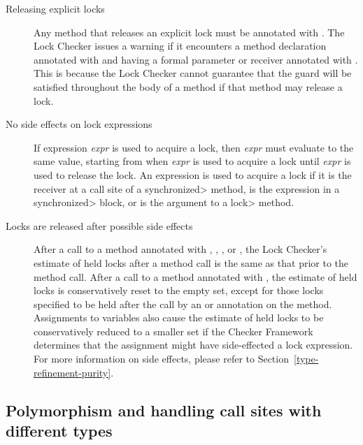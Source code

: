 \begin{description}

\item[Releasing explicit locks]
  Any method that releases an explicit lock must be annotated
  with .
  The Lock Checker issues a warning if it encounters a method declaration
  annotated with  and having a formal parameter
  or receiver annotated with .  This is because
  the Lock Checker cannot guarantee that the guard will be satisfied
  throughout the body of a method if that method may release a lock.

\item[No side effects on lock expressions]
  If expression \emph{expr} is used to acquire a lock, then
  \emph{expr} must evaluate to the same value, starting from when
  \emph{expr} is used to acquire a lock until \emph{expr} is used to
  release the lock.
  An expression is used to acquire a lock if it is the receiver at a
  call site of a \<synchronized> method, is the expression in a
  \<synchronized> block, or is the argument to a \<lock> method.

\item[Locks are released after possible side effects]
  After a call to a method annotated with ,
  , , or ,
  the Lock Checker's estimate of held locks
  after a method call is the same as that prior to the method call.
  After a call to a method annotated with ,
  the estimate of held locks is conservatively reset to the empty set,
  except for those locks specified to be held after the call
  by an  or 
  annotation on the method.  Assignments to variables also
  cause the estimate of held locks to be conservatively reduced
  to a smaller set if the Checker Framework determines that the
  assignment might have side-effected a lock expression.
  For more information on side effects, please refer to
  Section~\ref{type-refinement-purity}.

\end{description}


\subsection{Polymorphism and handling call sites with different types\label{lock-checker-polymorphism}}


